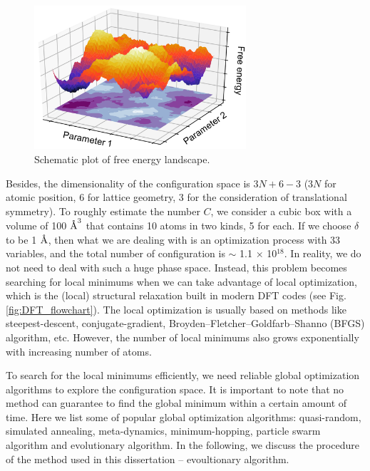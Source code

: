     \begin{figure}[htbp]
        \centering
        \captionsetup{singlelinecheck = false, justification=justified}
        \includegraphics[width=0.70\textwidth]{free_energy_landscape.png}
        \caption{Schematic plot of free energy landscape.}
        \label{fig:landscape}
    \end{figure}

Besides, the dimensionality of the configuration space is $3N+6-3$ ($3N$ for atomic position, 6 for lattice geometry, 3 for the consideration of translational symmetry). To roughly estimate the number $C$, we consider a cubic box with a volume of 100 $\text{\normalfont\AA}^3$ that contains 10 atoms in two kinds, 5 for each. If we choose $\delta$ to be 1 $\text{\normalfont\AA}$, then what we are dealing with is an optimization process with 33 variables, and the total number of configuration is $\sim$ 1.1 $\times$ 10$^{18}$. In reality, we do not need to deal with such a huge phase space. Instead, this problem becomes searching for local minimums when we can take advantage of local optimization, which is the (local) structural relaxation built in modern DFT codes (see Fig. \ref{fig:DFT_flowchart}). The local optimization is usually based on methods like steepest-descent, conjugate-gradient, Broyden–Fletcher–Goldfarb–Shanno (BFGS) algorithm, etc. However, the number of local minimums also grows exponentially with increasing number of atoms.



To search for the local minimums efficiently, we need reliable global optimization algorithms to explore the configuration space. It is important to note that no method can guarantee to find the global minimum within a certain amount of time. Here we list some of popular global optimization algorithms: quasi-random, simulated annealing, meta-dynamics, minimum-hopping, particle swarm algorithm and evolutionary algorithm. In the following, we discuss the procedure of the method used in this dissertation -- evoultionary algorithm.


